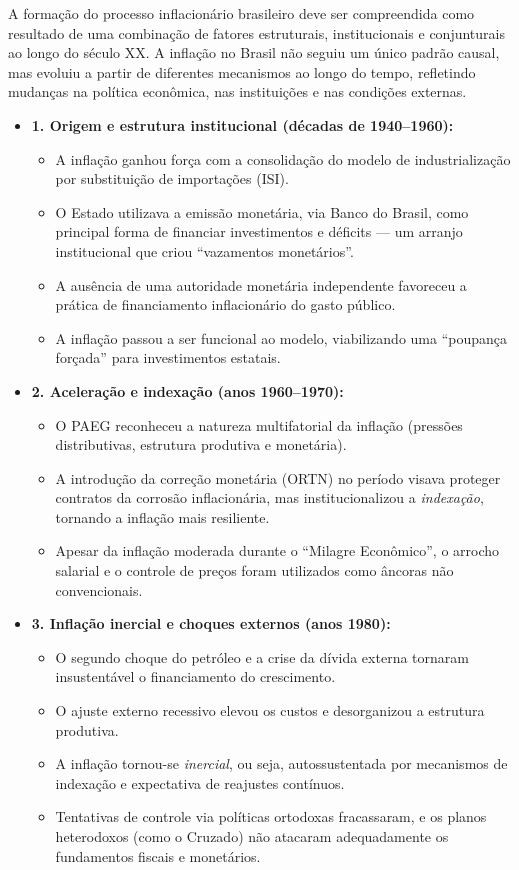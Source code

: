 \documentclass[a4paper,12pt]{article}[abntex2]
\begin{document}
A formação do processo inflacionário brasileiro deve ser compreendida como resultado de uma combinação de fatores estruturais, institucionais e conjunturais ao longo do século XX. A inflação no Brasil não seguiu um único padrão causal, mas evoluiu a partir de diferentes mecanismos ao longo do tempo, refletindo mudanças na política econômica, nas instituições e nas condições externas.

\begin{itemize}
    \item \textbf{1. Origem e estrutura institucional (décadas de 1940–1960):}
    \begin{itemize}
        \item A inflação ganhou força com a consolidação do modelo de industrialização por substituição de importações (ISI).
        \item O Estado utilizava a emissão monetária, via Banco do Brasil, como principal forma de financiar investimentos e déficits — um arranjo institucional que criou “vazamentos monetários”.
        \item A ausência de uma autoridade monetária independente favoreceu a prática de financiamento inflacionário do gasto público.
        \item A inflação passou a ser funcional ao modelo, viabilizando uma “poupança forçada” para investimentos estatais.
    \end{itemize}

    \item \textbf{2. Aceleração e indexação (anos 1960–1970):}
    \begin{itemize}
        \item O PAEG reconheceu a natureza multifatorial da inflação (pressões distributivas, estrutura produtiva e monetária).
        \item A introdução da correção monetária (ORTN) no período visava proteger contratos da corrosão inflacionária, mas institucionalizou a \textit{indexação}, tornando a inflação mais resiliente.
        \item Apesar da inflação moderada durante o “Milagre Econômico”, o arrocho salarial e o controle de preços foram utilizados como âncoras não convencionais.
    \end{itemize}

    \item \textbf{3. Inflação inercial e choques externos (anos 1980):}
    \begin{itemize}
        \item O segundo choque do petróleo e a crise da dívida externa tornaram insustentável o financiamento do crescimento.
        \item O ajuste externo recessivo elevou os custos e desorganizou a estrutura produtiva.
        \item A inflação tornou-se \textit{inercial}, ou seja, autossustentada por mecanismos de indexação e expectativa de reajustes contínuos.
        \item Tentativas de controle via políticas ortodoxas fracassaram, e os planos heterodoxos (como o Cruzado) não atacaram adequadamente os fundamentos fiscais e monetários.
    \end{itemize}


\end{itemize}
\end{document}
